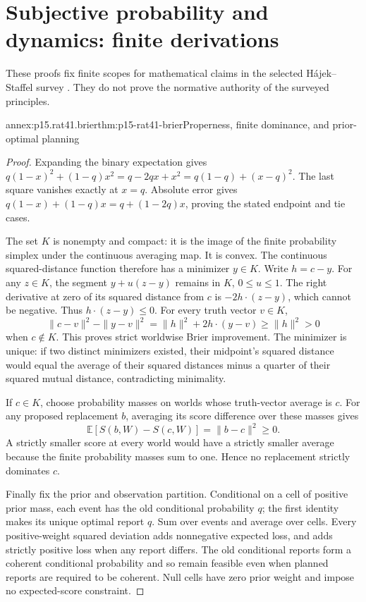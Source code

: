 \section{Subjective probability and dynamics: finite derivations}
\label{sec:p15-rat41-annex}

These proofs fix finite scopes for mathematical claims in the selected
H\'ajek--Staffel survey \parencite[pp.~239--248]{HajekStaffel2021Dynamics}.
They do not prove the normative authority of the surveyed principles.

\begin{annexitem}{annex:p15.rat41.brier}{thm:p15-rat41-brier}{Properness, finite dominance, and prior-optimal planning}
\begin{proof}
Expanding the binary expectation gives
\(q(1-x)^2+(1-q)x^2=q-2qx+x^2=q(1-q)+(x-q)^2\).
The last square vanishes exactly at \(x=q\). Absolute error gives
\(q(1-x)+(1-q)x=q+(1-2q)x\), proving the stated endpoint and tie cases.

The set \(K\) is nonempty and compact: it is the image of the finite
probability simplex under the continuous averaging map. It is convex.
The continuous squared-distance function therefore has a minimizer
\(y\in K\). Write \(h=c-y\). For any \(z\in K\), the segment
\(y+u(z-y)\) remains in \(K\), \(0\leq u\leq1\). The right derivative
at zero of its squared distance from \(c\) is
\(-2h\cdot(z-y)\), which cannot be negative. Thus
\(h\cdot(z-y)\leq0\). For every truth vector \(v\in K\),
\[
 \|c-v\|^2-\|y-v\|^2
       =\|h\|^2+2h\cdot(y-v)\geq\|h\|^2>0
\]
when \(c\notin K\). This proves strict worldwise Brier improvement.
The minimizer is unique: if two distinct minimizers existed, their
midpoint's squared distance would equal the average of their squared
distances minus a quarter of their squared mutual distance, contradicting
minimality.

If \(c\in K\), choose probability masses on worlds whose truth-vector
average is \(c\). For any proposed replacement \(b\), averaging its
score difference over these masses gives
\[
                       \mathbb E[S(b,W)-S(c,W)]=\|b-c\|^2\geq0.
\]
A strictly smaller score at every world would have a strictly smaller
average because the finite probability masses sum to one. Hence no
replacement strictly dominates \(c\).

Finally fix the prior and observation partition. Conditional on a cell
of positive prior mass, each event has the old conditional probability
\(q\); the first identity makes its unique optimal report \(q\).
Sum over events and average over cells. Every positive-weight squared
deviation adds nonnegative expected loss, and adds strictly positive loss
when any report differs. The old conditional reports form a coherent
conditional probability and so remain feasible even when planned reports
are required to be coherent. Null cells have zero prior weight and impose
no expected-score constraint.
\end{proof}
\end{annexitem}

